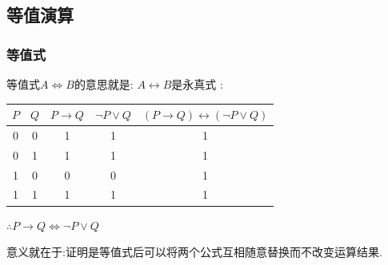 \documentclass[UTF8,12pt]{ctexbook}
\begin{document}
{{{{}%

\subsection{等值演算}{

  \subsubsection{等值式}{
    等值式$A \Leftrightarrow B$的意思就是: $A \longleftrightarrow B$是永真式 :

    \begin{center}
      \begin{tabular}{c|c|c|c|c}
        \hline
        $P$ & $Q$ & $P \to Q$ & $\lnot P \lor Q$ & $(P \to Q) \longleftrightarrow (\lnot P \lor Q)$ \\
        \hline
        0   & 0   & 1         & 1                & 1                                                \\
        0   & 1   & 1         & 1                & 1                                                \\
        1   & 0   & 0         & 0                & 1                                                \\
        1   & 1   & 1         & 1                & 1                                                \\
        \hline
      \end{tabular}
    \end{center}

    $\therefore P \to Q \Leftrightarrow \lnot P \lor Q$

    意义就在于:证明是等值式后可以将两个公式互相随意替换而不改变运算结果.
  }%

}}}}
\end{document}
